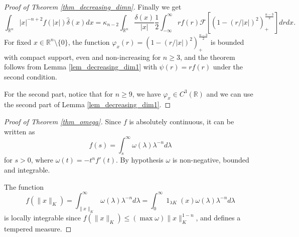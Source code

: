 \documentclass{amsart}
\def \R {\mathbb R}
\renewcommand {\chi}{\operatorname{1}}
\begin{document}
\begin{proof}[Proof of Theorem \ref{thm_decreasing_dimn}]
Finally we get
	\[\int_{\R^n} |x|^{-n+2} f(|x|) \hat \delta(x) dx = \kappa_{n-2} \int_{\R^n} \frac {\delta(x)}{|x|} \frac 12 \int_{-\infty}^\infty r f(r) \mathcal F[ ( 1 - (r/|x|)^2 )_+^{\frac{n-3}2}] dr dx.\]
	For fixed $x \in \R^n \setminus \{0\}$, the function $\varphi_x(r) = ( 1 - (r/|x|)^2 )_+^{\frac{n-3}2}$ is bounded with compact support, even and non-increasing for $n\geq 3$, and the theorem follows from Lemma \ref{lem_decreasing_dim1} with $\psi(r) = r f(r)$ under the second condition.

	For the second part, notice that for $n \geq 9$, we have $\varphi_x \in C^3(\R)$ and we can use the second part of Lemma \ref{lem_decreasing_dim1}.
\end{proof}

\begin{proof}[Proof of Theorem \ref{thm_omega}]
	Since $f$ is absolutely continuous, it can be written as
	\[f(s) = \int_s^\infty \omega(\lambda) \lambda^{-n} d\lambda\]
for $s>0$, where $\omega(t) = - t^n f'(t)$.
	By hypothesis $\omega$ is non-negative, bounded and integrable.

The function
\[f(\|x\|_K) = \int_{\|x\|_K}^\infty \omega(\lambda) \lambda^{-n} d\lambda = \int_0^\infty \chi_{\lambda K}(x) \omega(\lambda) \lambda^{-n} d\lambda \]
	is locally integrable since $f(\|x\|_K) \leq (\max \omega) \|x\|_K^{1-n}$, and defines a tempered measure.


\end{proof}
\end{document}
